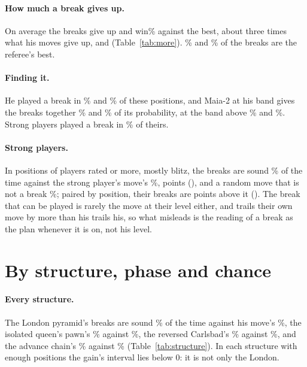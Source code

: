 \documentclass[11pt]{article}
\begin{document}
\MoreTable

\paragraph{How much a break gives up.} On average the breaks give up \LostBFirst{} and
\LostBSecond{} win\% against the best, about three times what his moves give up, \LostAFirst{}
and \LostASecond{} (Table~\ref{tab:more}). \BestBFirst\% and \BestBSecond\% of the breaks are
the referee's best.

\paragraph{Finding it.} He played a break in \PlayedFirst\% and \PlayedSecond\% of these
positions, and Maia-2 at his band gives the breaks together \MassHisFirst\% and \MassHisSecond\%
of its probability, at the band above \MassPlusFirst\% and \MassPlusSecond\%. Strong players
played a break in \StrongPlayed\% of theirs.

\paragraph{Strong players.} In \StrongScored{} positions of players rated \Floor{} or more, mostly
blitz, the breaks are sound \StrongB\% of the time against the strong player's move's \StrongS\%,
\StrongGain{} points (\StrongGainCi), and a random move that is not a break \StrongR\%; paired by
position, their breaks are \StrongBR{} points above it (\StrongBRCi). The break that can be played
is rarely the move at their level either, and trails their own move by more than his trails his,
so what misleads is the reading of a break as the plan whenever it is on, not his level.

\section{By structure, phase and chance}

\StructureTable

\paragraph{Every structure.} The London pyramid's breaks are sound \StructLondonPyramidB\% of the
time against his move's \StructLondonPyramidA\%, the isolated queen's pawn's \StructIqpB\% against
\StructIqpA\%, the reversed Carlsbad's \StructCarlsbadReversedB\% against
\StructCarlsbadReversedA\%, and the advance chain's \StructAdvanceChainB\% against
\StructAdvanceChainA\% (Table~\ref{tab:structure}). In each structure with enough positions the
gain's interval lies below 0: it is not only the London.
\end{document}
